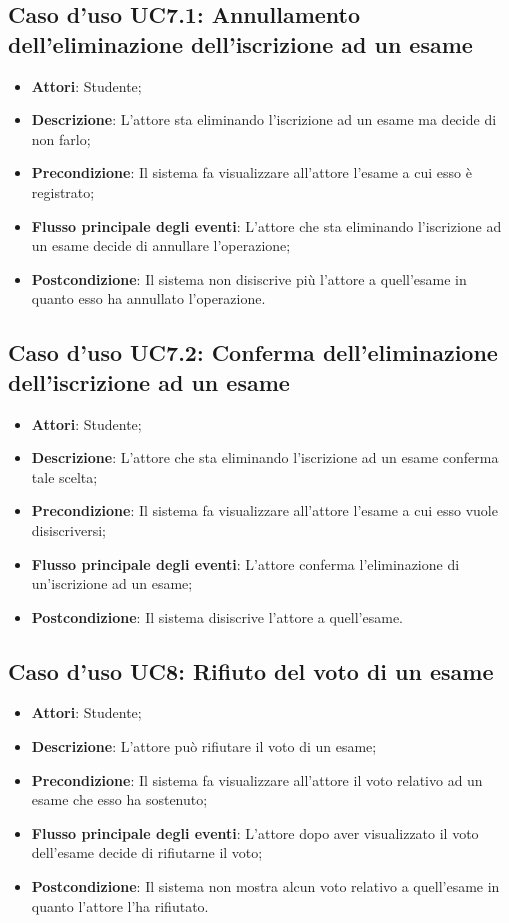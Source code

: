 \subsection{Caso d'uso \texorpdfstring{UC7.1}{UC7.1}: Annullamento dell'eliminazione dell'iscrizione ad un esame}
\begin{itemize}
	\item \textbf{Attori}: Studente;
	\item \textbf{Descrizione}: L'attore sta eliminando l'iscrizione ad un esame ma decide di non farlo;
	\item \textbf{Precondizione}: Il sistema fa visualizzare all'attore l'esame a cui esso è registrato;
	
	\item \textbf{Flusso principale degli eventi}: L'attore che sta eliminando l'iscrizione ad un esame decide di annullare l'operazione;
	\item \textbf{Postcondizione}: Il sistema non disiscrive più l'attore a quell'esame in quanto esso ha annullato l'operazione.
	
\end{itemize}
\subsection{Caso d'uso \texorpdfstring{UC7.2}{UC7.2}: Conferma dell'eliminazione dell'iscrizione ad un esame}
\begin{itemize}
	\item \textbf{Attori}: Studente;
	\item \textbf{Descrizione}: L'attore che sta eliminando l'iscrizione ad un esame conferma tale scelta;
	\item \textbf{Precondizione}: Il sistema fa visualizzare all'attore l'esame a cui esso vuole disiscriversi;
	
	\item \textbf{Flusso principale degli eventi}: L'attore conferma l'eliminazione di un'iscrizione ad un esame;
	\item \textbf{Postcondizione}: Il sistema disiscrive l'attore a quell'esame.
	
\end{itemize}
\subsection{Caso d'uso \texorpdfstring{UC8}{UC8}: Rifiuto del voto di un esame}
\begin{itemize}
	\item \textbf{Attori}: Studente;
	\item \textbf{Descrizione}: L'attore può rifiutare il voto di un esame;
	\item \textbf{Precondizione}: Il sistema fa visualizzare all'attore il voto relativo ad un esame che esso ha sostenuto;
	\item \textbf{Flusso principale degli eventi}: L'attore dopo aver visualizzato il voto dell'esame decide di rifiutarne il voto;
	\item \textbf{Postcondizione}: Il sistema non mostra alcun voto relativo a quell'esame in quanto l'attore l'ha rifiutato.
\end{itemize}
